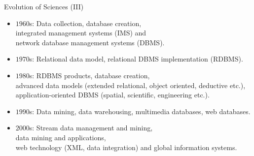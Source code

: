 \begin{frame}{Evolution of Sciences (III)}
	\begin{itemize}
		\item $1960$s: Data collection, database creation, \\
		      \hspace{1cm} integrated management systems (IMS) and \\
		      \hspace{1cm} network database management systems (DBMS).
		\item $1970$s: Relational data model, relational DBMS implementation
		      (RDBMS).
		\item $1980$s: RDBMS products, database creation, \\
		      \hspace{1cm} advanced data models (extended relational, object
		      oriented, deductive etc.),\\
		      \hspace{1cm} application-oriented DBMS (spatial, scientific,
		      engineering etc.).
		\item $1990$s: Data mining, data warehousing, multimedia databases, web
		      databases.
		\item $2000$s: Stream data management and mining,\\
		      \hspace{1cm} data mining and applications, \\
		      \hspace{1cm} web technology (XML, data integration) and global
		      information systems.
	\end{itemize}
\end{frame}
